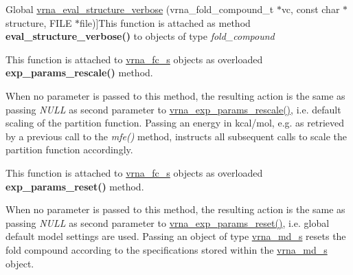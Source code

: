 \begin{DoxyRefList}
Global \hyperlink{group__eval_ga0928d699d310178f84ee2351034e5cb5}{vrna\+\_\+eval\+\_\+structure\+\_\+verbose} (vrna\+\_\+fold\+\_\+compound\+\_\+t $\ast$vc, const char $\ast$structure, F\+I\+LE $\ast$file)]This function is attached as method {\bfseries eval\+\_\+structure\+\_\+verbose()} to objects of type {\itshape fold\+\_\+compound}  
\item[\label{wrappers__wrappers000051}%
\Hypertarget{wrappers__wrappers000051}%
Global \hyperlink{group__energy__parameters_gad607bc3a5b5da16400e2ca4ea5560233}{vrna\+\_\+exp\+\_\+params\+\_\+rescale} (vrna\+\_\+fold\+\_\+compound\+\_\+t $\ast$vc, double $\ast$mfe)]This function is attached to \hyperlink{group__fold__compound_structvrna__fc__s}{vrna\+\_\+fc\+\_\+s} objects as overloaded {\bfseries exp\+\_\+params\+\_\+rescale()} method.

When no parameter is passed to this method, the resulting action is the same as passing {\itshape N\+U\+LL} as second parameter to \hyperlink{group__energy__parameters_gad607bc3a5b5da16400e2ca4ea5560233}{vrna\+\_\+exp\+\_\+params\+\_\+rescale()}, i.\+e. default scaling of the partition function. Passing an energy in kcal/mol, e.\+g. as retrieved by a previous call to the {\itshape mfe()} method, instructs all subsequent calls to scale the partition function accordingly.  
\item[\label{wrappers__wrappers000053}%
\Hypertarget{wrappers__wrappers000053}%
Global \hyperlink{group__energy__parameters_gaa5409218068be84d7b50c78fbdaa85a9}{vrna\+\_\+exp\+\_\+params\+\_\+reset} (vrna\+\_\+fold\+\_\+compound\+\_\+t $\ast$vc, vrna\+\_\+md\+\_\+t $\ast$md\+\_\+p)]This function is attached to \hyperlink{group__fold__compound_structvrna__fc__s}{vrna\+\_\+fc\+\_\+s} objects as overloaded {\bfseries exp\+\_\+params\+\_\+reset()} method.

When no parameter is passed to this method, the resulting action is the same as passing {\itshape N\+U\+LL} as second parameter to \hyperlink{group__energy__parameters_gaa5409218068be84d7b50c78fbdaa85a9}{vrna\+\_\+exp\+\_\+params\+\_\+reset()}, i.\+e. global default model settings are used. Passing an object of type \hyperlink{group__model__details_structvrna__md__s}{vrna\+\_\+md\+\_\+s} resets the fold compound according to the specifications stored within the \hyperlink{group__model__details_structvrna__md__s}{vrna\+\_\+md\+\_\+s} object.  
\item[\label{wrappers__wrappers000039}%
\Hypertarget{wrappers__wrappers000039}%
Class \hyperlink{group__fold__compound}{vrna\+\_\+fc\+\_\+s} ]


\end{DoxyRefList}
